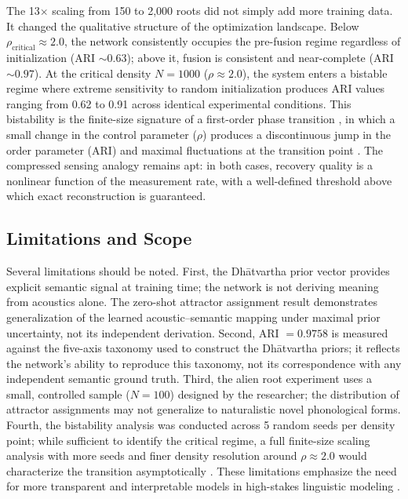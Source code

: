 \documentclass{article}
\begin{document}
The 13$\times$ scaling from 150 to 2,000 roots did not simply add more training data.
It changed the qualitative structure of the optimization landscape. Below $\rho_{\text{critical}}
\approx 2.0$, the network consistently occupies the pre-fusion regime regardless of
initialization (ARI $\sim 0.63$); above it, fusion is consistent and near-complete
(ARI $\sim 0.97$). At the critical density $N = 1000$ ($\rho \approx 2.0$), the system
enters a bistable regime where extreme sensitivity to random initialization produces ARI
values ranging from 0.62 to 0.91 across identical experimental conditions. This
bistability is the finite-size signature of a first-order phase transition
\citep{nishimori2010statistical}, in which a small change in the control parameter
($\rho$) produces a discontinuous jump in the order parameter (ARI) and maximal
fluctuations at the transition point \citep{sethna2006cracks}. The compressed sensing
analogy \citep{donoho2006compressed} remains apt: in both cases, recovery quality is a
nonlinear function of the measurement rate, with a well-defined threshold above which
exact reconstruction is guaranteed.

\subsection{Limitations and Scope}

Several limitations should be noted. First, the Dhātvartha prior vector provides
explicit semantic signal at training time; the network is not deriving meaning from
acoustics alone. The zero-shot attractor assignment result demonstrates generalization
of the learned acoustic--semantic mapping under maximal prior uncertainty, not its
independent derivation. Second, ARI $= 0.9758$ is measured against the five-axis
taxonomy used to construct the Dhātvartha priors; it reflects the network's ability
to reproduce this taxonomy, not its correspondence with any independent semantic ground
truth. Third, the alien root experiment uses a small, controlled sample ($N=100$)
designed by the researcher; the distribution of attractor assignments may not
generalize to naturalistic novel phonological forms. Fourth, the bistability analysis
was conducted across 5 random seeds per density point; while sufficient to identify
the critical regime, a full finite-size scaling analysis with more seeds and finer
density resolution around $\rho \approx 2.0$ would characterize the transition
asymptotically \citep{nishimori2010statistical}. These limitations emphasize the
need for more transparent and interpretable models in high-stakes linguistic
modeling \citep{rudin2019,arrieta2020,murdoch2019}.
\end{document}
